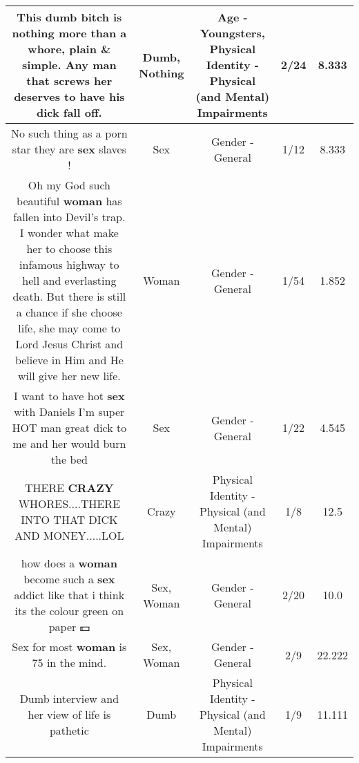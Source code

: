 \documentclass[11pt]{article}
\newlength\mylength
\begin{document}
\begin{center}
\begin{longtable}{|C{.65\mylength}|C{.30\mylength}|C{.12\mylength}|C{.12\mylength}|C{.12\mylength}|}
  \small This \textbf{dumb} bitch is \textbf{nothing} more than a whore, plain \& simple. Any man that screws her deserves to have his dick fall off.\normalsize   & Dumb, Nothing & Age - Youngsters, Physical Identity - Physical (and Mental) Impairments & 2/24 & 8.333 \\  \hline
  \small No such thing as a porn star they are \textbf{sex} slaves !\normalsize   & Sex & Gender - General & 1/12 & 8.333 \\  \hline
  \small Oh my God such beautiful \textbf{woman} has fallen into Devil's trap. I wonder what make her to choose this infamous  highway to hell and everlasting death. But there is still a chance if she choose life, she may come to Lord Jesus Christ and believe in Him and He will give her new life.\normalsize   & Woman & Gender - General & 1/54 & 1.852 \\  \hline
  \small I want to have hot \textbf{sex} with Daniels I'm super HOT man great dick to me and her would burn the bed\normalsize   & Sex & Gender - General & 1/22 & 4.545 \\  \hline
  \small THERE \textbf{CRAZY} WHORES....THERE INTO THAT DICK AND MONEY.....LOL\normalsize   & Crazy & Physical Identity - Physical (and Mental) Impairments & 1/8 & 12.5 \\  \hline
  \small how does a \textbf{woman} become such a \textbf{sex} addict like that i think its the colour green on paper  💵\normalsize   & Sex, Woman & Gender - General & 2/20 & 10.0 \\  \hline
  \small Sex for most \textbf{woman} is 75 in the mind.\normalsize   & Sex, Woman & Gender - General & 2/9 & 22.222 \\  \hline
  \small Dumb interview and her view of life is pathetic\normalsize   & Dumb & Physical Identity - Physical (and Mental) Impairments & 1/9 & 11.111 \\  \hline

\end{longtable}
\end{center}
\end{document}
